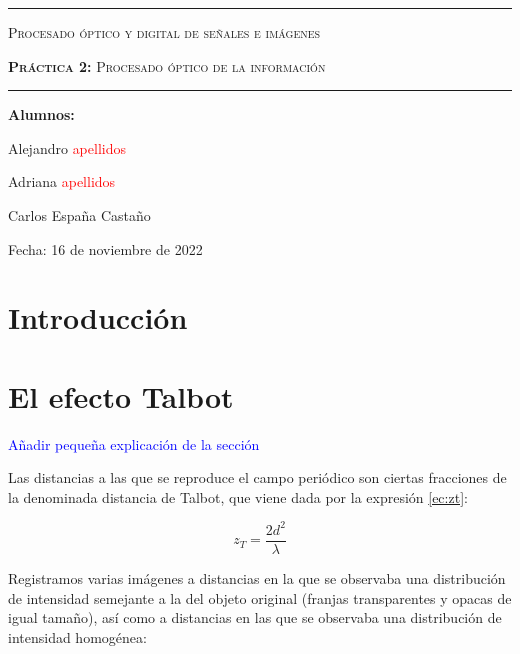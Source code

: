 \documentclass[12pt,a5paper]{article}
\begin{document}
\begin{titlepage}
\centering
\rule{16 cm}{2 pt}
{\scshape\Huge Procesado óptico y digital de señales e imágenes \par}
\vspace{2cm}
{\scshape\Large \textbf{Práctica 2:} Procesado óptico de la información\par}
\rule{16 cm}{2 pt}
\vfill
{\Large \textbf{Alumnos:}\par Alejandro \textcolor{red}{apellidos} \par Adriana \textcolor{red}{apellidos} \par Carlos España Castaño \par}
{\Large Fecha: 16 de noviembre de 2022 \par}
\end{titlepage}



\newpage
\tableofcontents
\newpage



\section{Introducción}





\section{El efecto Talbot}
\textcolor{blue}{Añadir pequeña explicación de la sección}\par
Las distancias a las que se reproduce el campo periódico son ciertas fracciones de la denominada distancia de Talbot, que viene dada por la expresión \ref{ec:zt}:

\begin{center}
    \begin{equation}
        z_T = \frac{2d^2}{\lambda}
        \label{ec:zt}
    \end{equation}
\end{center}


Registramos varias imágenes a distancias en la que se observaba una distribución de intensidad semejante a la del objeto original (franjas transparentes y opacas de igual tamaño), así como a distancias en las que se observaba una distribución de intensidad homogénea:\par
\end{document}
